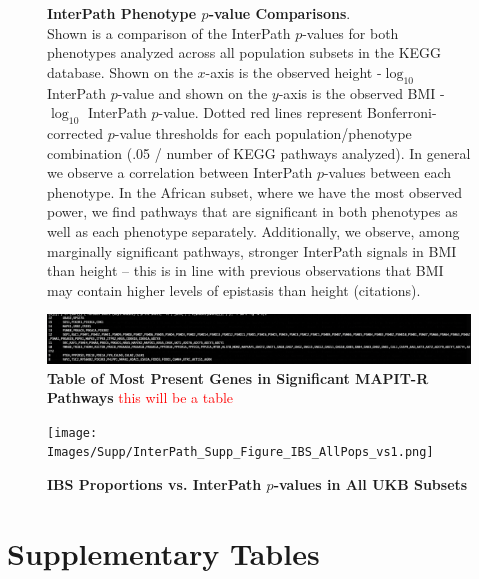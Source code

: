\documentclass[12pt, a4paper]{article}
\begin{document}
\begin{figure}[htbp]
\caption[TBD]{\textbf{InterPath Phenotype $p$-value Comparisons}. \\ Shown is a comparison of the InterPath $p$-values for both phenotypes analyzed across all population subsets in the KEGG database. Shown on the $x$-axis is the observed height -$\log_{10}$ InterPath $p$-value and shown on the $y$-axis is the observed BMI -$\log_{10}$ InterPath $p$-value. Dotted red lines represent Bonferroni-corrected $p$-value thresholds for each population/phenotype combination (.05 / number of KEGG pathways analyzed). In general we observe a correlation between InterPath $p$-values between each phenotype. In the African subset, where we have the most observed power, we find pathways that are significant in both phenotypes as well as each phenotype separately. Additionally, we observe, among marginally significant pathways, stronger InterPath signals in BMI than height -- this is in line with previous observations that BMI may contain higher levels of epistasis than height (citations).}
\label{InterPath-Supp-Figure-PhenoCompDotPlots}
\end{figure}

\begin{landscape}
\begin{figure}[htbp]
\centering
\hspace*{-2.5cm}
\includegraphics[scale=1]{Images/Supp/InterPath_Supp_Table_TopPathwayGeneCounts.png}
\caption[TBD]{\textbf{Table of Most Present Genes in Significant MAPIT-R Pathways} \textcolor{red}{this will be a table}}
\label{InterPath-Supp-Tables-GeneCounts}
\end{figure}
\end{landscape}

\begin{figure}[htbp]
\centering
\texttt{[image: Images/Supp/InterPath\_Supp\_Figure\_IBS\_AllPops\_vs1.png]}
\caption[TBD]{\textbf{IBS Proportions vs. InterPath $p$-values in All UKB Subsets}}
\label{InterPath-Supp-Figure-IBS-AllPops}
\end{figure}

\section{Supplementary Tables}\label{Supplementary-Tables}




\begingroup


\endgroup
\end{document}
